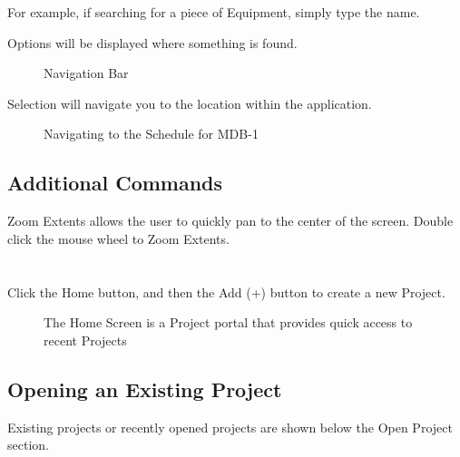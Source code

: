 \documentclass[letterpaper,10pt,english]{sphinxmanual}
\begin{document}
For example, if searching for a piece of Equipment, simply type the name.

Options will be displayed where something is found.

\begin{figure}[H]
\centering
\capstart

\noindent{}
\caption{Navigation Bar}\label{\detokenize{docs/userguide/index-user_guide:id19}}\end{figure}

Selection will navigate you to the location within the application.

\begin{figure}[H]
\centering
\capstart

\noindent{}
\caption{Navigating to the Schedule for MDB-1}\label{\detokenize{docs/userguide/index-user_guide:id20}}\end{figure}


\subsection{Additional Commands}
\label{\detokenize{docs/userguide/index-user_guide:additional-commands}}
Zoom Extents allows the user to quickly pan to the center of the screen.  Double click the mouse wheel to Zoom Extents.

\ignorespaces 

\section{}
\label{\detokenize{docs/userguide/index-user_guide:creating-a-new-project}}\label{\detokenize{docs/userguide/index-user_guide:index-0}}
Click the Home button, and then the Add (+) button to create a new Project.

\begin{figure}[H]
\centering
\capstart

\noindent{}
\caption{The Home Screen is a Project portal that provides quick access to recent Projects}\label{\detokenize{docs/userguide/index-user_guide:id21}}\end{figure}


\subsection{Opening an Existing Project}
\label{\detokenize{docs/userguide/index-user_guide:opening-an-existing-project}}
Existing projects or recently opened projects are shown below the Open Project section.
\end{document}
